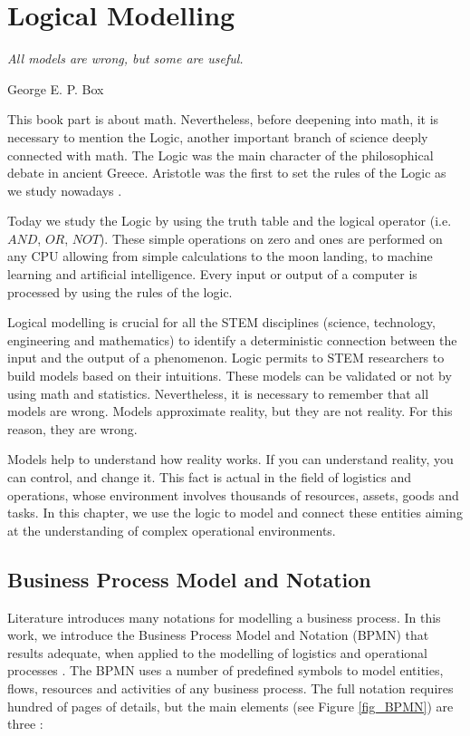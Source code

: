 
\chapter{Logical Modelling} \label{chapLogicalModelling}

\epigraph{\textit{All models are wrong, but some are useful.}}{George E. P. Box}

This book part is about math. Nevertheless, before deepening into math, it is necessary to mention the Logic, another important branch of science deeply connected with math. The Logic was the main character of the philosophical debate in ancient Greece. Aristotle was the first to set the rules of the Logic as we study nowadays \cite{Aristoteles}. \par

Today we study the Logic by using the truth table and the logical operator (i.e. $AND$, $OR$, $NOT$). These simple operations on zero and ones are performed on any CPU allowing from simple calculations to the moon landing, to machine learning and artificial intelligence. Every input or output of a computer is processed by using the rules of the logic. \par

Logical modelling is crucial for all the STEM disciplines (science, technology, engineering and mathematics) to identify a deterministic connection between the input and the output of a phenomenon. Logic permits to STEM researchers to build models based on their intuitions. These models can be validated or not by using math and statistics. Nevertheless, it is necessary to remember that all models are wrong. Models approximate reality, but they are not reality. For this reason, they are wrong.\par

Models help to understand how reality works. If you can understand reality, you can control, and change it. This fact is actual in the field of logistics and operations, whose environment involves thousands of resources, assets, goods and tasks. In this chapter, we use the logic to model and connect these entities aiming at the understanding of complex operational environments.\par 

\section{Business Process Model and Notation} \label{secBPMN}
Literature introduces many notations for modelling a business process. In this work, we introduce the Business Process Model and Notation (BPMN) that results adequate, when applied to the modelling of logistics and operational processes \cite{OMG1998}. The BPMN uses a number of predefined symbols to model entities, flows, resources and activities of any business process. The full notation requires hundred of pages of details, but the main elements (see Figure \ref{fig_BPMN}) are three \cite{White2004}:

